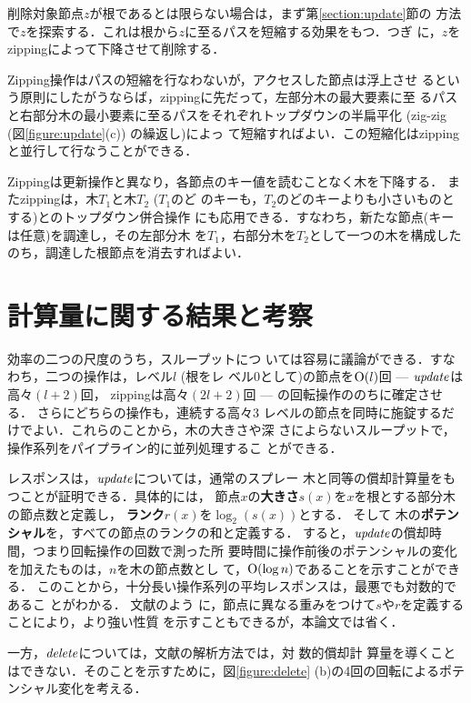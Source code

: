 \documentclass{compsoft}
\begin{document}
削除対象節点$z$が根であるとは限らない場合は，まず第\ref{section:update}節の
方法で$z$を探索する．これは根から$z$に至るパスを短縮する効果をもつ．つぎ
に，$z$をzippingによって下降させて削除する．

Zipping操作はパスの短縮を行なわないが，アクセスした節点は浮上させ
るという原則にしたがうならば，zippingに先だって，左部分木の最大要素に至
るパスと右部分木の最小要素に至るパスをそれぞれトップダウンの半扁平化
(zig-zig (図\ref{figure:update}(c)) の繰返し)によっ
て短縮すればよい．この短縮化はzippingと並行して行なうことができる．

Zippingは更新操作と異なり，各節点のキー値を読むことなく木を下降する．
またzippingは，木$T_1$と木$T_2$ ($T_1$のど
のキーも，$T_2$のどのキーよりも小さいものとする)とのトップダウン併合操作
にも応用できる．すなわち，新たな節点(キーは任意)を調達し，その左部分木
を$T_1$，右部分木を$T_2$として一つの木を構成した
のち，調達した根節点を消去すればよい．

\section{計算量に関する結果と考察}

効率の二つの尺度のうち，スループットにつ
いては容易に議論ができる．すなわち，二つの操作は，レベル$l$ (根をレ
ベル$0$として)の節点を${\rm O}(l)$回 --- ${\it update\/}$は高々$(l+2)$回，
zippingは高々$(2l+2)$回 ---
の回転操作ののちに確定させる．
さらにどちらの操作も，連続する高々$3$
レベルの節点を同時に施錠するだけでよい．これらのことから，木の大きさや深
さによらないスループットで，操作系列をパイプライン的に並列処理するこ
とができる．

レスポンスは，${\it update\/}$については，通常のスプレー
木と同等の償却計算量をもつことが証明できる．具体的には，
節点$x$の{\bf 大きさ}$s(x)$を$x$を根とする部分木の節点数と定義し，
{\bf ランク}$r(x)$を$\log_2(s(x))$とする．
そして
%
木の{\bf ポテンシャル}を，すべての節点のランクの和と定義する．
すると，${\it update\/}$の償却時間，つまり回転操作の回数で測った所
要時間に操作前後のポテンシャルの変化を加えたものは，$n$を木の節点数とし
て，${\rm O}(\log n)$であることを示すことができる．
このことから，十分長い操作系列の平均レスポンスは，最悪でも対数的であるこ
とがわかる．
文献\Cite{ST85}のよう
に，節点に異なる重みをつけて$s$や$r$を定義することにより，より強い性質
を示すこともできるが，本論文では省く．

一方，${\it delete\/}$については，文献\Cite{ST85}の解析方法では，対
数的償却計
算量を導くことはできない．そのことを示すために，図\ref{figure:delete}
(b)の4回の回転によるポテンシャル変化を考える．
\end{document}
